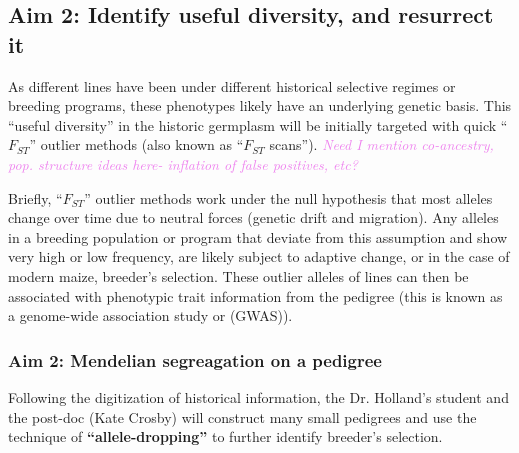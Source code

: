 \documentclass[draft,12pt]{article}
\newcommand{\kc}[1]{\textcolor{violet}{ \emph{\scriptsize  #1}} }
\begin{document}
\subsection*{Aim 2: Identify useful diversity, and resurrect it}
\label{ssec:GWAS}
As different lines have been under different historical selective regimes or breeding programs, these phenotypes likely have an underlying genetic basis. This ``useful diversity'' in the historic germplasm will be initially targeted with quick ``$F_{ST}$'' outlier  methods (also known as ``$F_{ST}$ scans'').
\kc{Need I mention co-ancestry, pop. structure ideas here- inflation of false positives, etc?}

Briefly, ``$F_{ST}$'' outlier methods work under the null hypothesis that most alleles change over time due to neutral forces (genetic drift and migration). 
Any alleles in a breeding population or program that deviate from this assumption and show very high or low frequency, are likely subject to adaptive change, or in the case of modern maize, breeder's selection. These outlier alleles of lines can then be associated with phenotypic trait information from the pedigree (this is known as a genome-wide association study or (GWAS)). 

\subsubsection*{Aim 2: Mendelian segreagation on a pedigree}
Following the digitization of historical information, the Dr. Holland's student and the post-doc (Kate Crosby) will construct many small pedigrees and use the technique of \textbf{``allele-dropping''} to further identify breeder's selection. 
\end{document}
